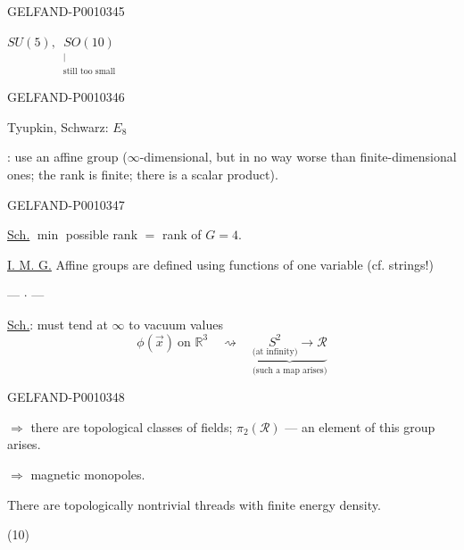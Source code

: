 \begin{GelfandAdjacentEvidence}{GELFAND-P001034}{5}

$SU(5),\ \underset{\substack{\vert\\\text{still too small}}}{SO(10)}$
\end{GelfandAdjacentEvidence}
\begin{GelfandAdjacentEvidence}{GELFAND-P001034}{6}


Tyupkin, Schwarz: $E_8$

: use an affine group ($\infty$-dimensional, but in no way worse than finite-dimensional ones;
the rank is finite; there is a scalar product).
\end{GelfandAdjacentEvidence}
\begin{GelfandAdjacentEvidence}{GELFAND-P001034}{7}


\underline{Sch.} $\min$ possible rank $=$ rank of $G=4$.

\underline{I. M. G.} Affine groups are defined using functions of one variable (cf. strings!)

\begin{center}--- $\cdot$ ---\end{center}

\underline{Sch.}:  must tend at $\infty$ to vacuum values
\begin{equation*}
\phi(\vec x)\ \text{on }\mathbb R^3\quad\rightsquigarrow\quad
\underbrace{\underset{\text{(at infinity)}}{S^2}\to\mathcal R}_{\text{(such a map arises)}}
\tag{9}
\end{equation*}
\end{GelfandAdjacentEvidence}
\begin{GelfandAdjacentEvidence}{GELFAND-P001034}{8}


$\Rightarrow$ there are topological classes of fields; $\pi_2(\mathcal R)$ --- an element of this group arises.

$\Rightarrow$ magnetic monopoles.

There are topologically nontrivial threads with finite energy density.

(10)
\end{GelfandAdjacentEvidence}
